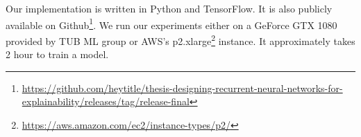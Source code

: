 Our implementation is written in Python and TensorFlow\cite{AbadiTensorFlowLargeScaleMachine2016}. It is also publicly available on Github\footnote{\url{https://github.com/heytitle/thesis-designing-recurrent-neural-networks-for-explainability/releases/tag/release-final}}.  We run our experiments either on a GeForce GTX 1080 provided by TUB ML group or AWS's p2.xlarge\footnote{\url{https://aws.amazon.com/ec2/instance-types/p2/}} instance. It approximately takes 2 hour to train a model. 



 
%
%
%
%
%
%

